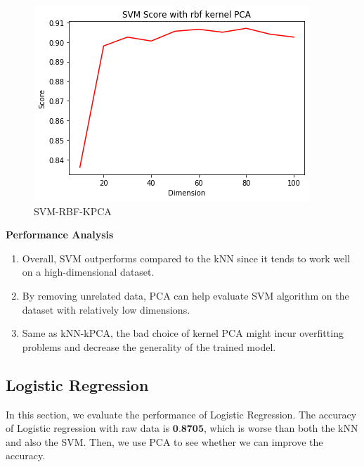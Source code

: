 \documentclass[12pt]{article}
\begin{document}
\begin{figure}[htb]
\begin{minipage}{0.3\textwidth}
		\includegraphics[width=\linewidth]{./exp-figs/SVM-RBF-KPCA.png}
		\caption{SVM-RBF-KPCA}
		\label{fig:SVM-RBF-KPCA}
	\end{minipage}
\end{figure}

\textbf{Performance Analysis} 

\begin{enumerate}[label=(\roman*)]
	\item Overall, SVM outperforms compared to the kNN since it tends to work well on a high-dimensional dataset.
	\item By removing unrelated data, PCA can help evaluate SVM algorithm on the dataset with relatively low dimensions. 
	\item Same as kNN-kPCA, the bad choice of kernel PCA might incur overfitting problems and decrease the generality of the trained model.
\end{enumerate}

\subsection{Logistic Regression}
In this section, we evaluate the performance of Logistic Regression. The accuracy of Logistic regression with raw data is $\textbf{0.8705}$, which is worse than both the kNN and also the SVM. Then, we use PCA to see whether we can improve the accuracy.
\end{document}
